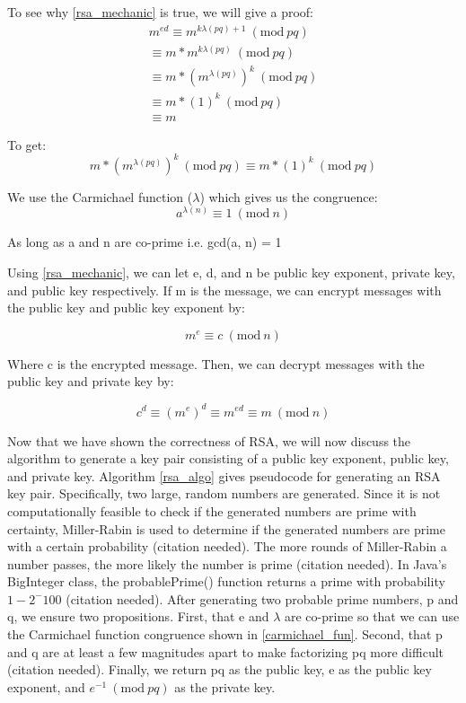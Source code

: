 \documentclass[acmlarge]{acmart}
\newcommand{\Mod}[1]{\ (\mathrm{mod}\ #1)}
\begin{document}
To see why \ref{rsa_mechanic} is true, we will give a proof:
\begin{equation}
\begin{split}
	m^{ed} 
	\equiv m^{k\lambda(pq) + 1} \Mod{pq} \\
	\equiv m * m^{k\lambda(pq)} \Mod{pq} \\
	\equiv m * (m^{\lambda(pq)})^{k} \Mod{pq} \\
	\equiv m * (1)^{k} \Mod{pq} \\
	\equiv m
\end{split}
\end{equation}

To get:
\begin{equation}
	m * (m^{\lambda(pq)})^{k} \Mod{pq} \equiv m * (1)^{k} \Mod{pq}
\end{equation}

We use the Carmichael function ($\lambda$) which gives us the congruence:
\begin{equation}
\label{carmichael_fun}
	a^{\lambda(n)} \equiv 1 \Mod{n}
\end{equation}

As long as a and n are co-prime i.e. gcd(a, n) = 1

Using \ref{rsa_mechanic}, we can let e, d, and n be public key exponent, private key, and public key respectively. If m is the message, we can encrypt messages with the public key and public key exponent by:

\begin{equation}
	m^{e} \equiv c \Mod{n}
\end{equation}

Where c is the encrypted message. Then, we can decrypt messages with the public key and private key by:

\begin{equation}
	c^{d} \equiv (m^{e})^{d} \equiv m^{ed} \equiv m \Mod{n}
\end{equation}

Now that we have shown the correctness of RSA, we will now discuss the algorithm to generate a key pair consisting of a public key exponent, public key, and private key. Algorithm \ref{rsa_algo} gives pseudocode for generating an RSA key pair. Specifically, two large, random numbers are generated. Since it is not computationally feasible to check if the generated numbers are prime with certainty, Miller-Rabin is used to determine if the generated numbers are prime with a certain probability (citation needed). The more rounds of Miller-Rabin a number passes, the more likely the number is prime (citation needed). In Java's BigInteger class, the probablePrime() function returns a prime with probability $1 - 2^-100$ (citation needed). After generating two probable prime numbers, p and q, we ensure two propositions. First, that e and $\lambda$ are co-prime so that we can use the Carmichael function congruence shown in \ref{carmichael_fun}. Second, that p and q are at least a few magnitudes apart to make factorizing pq more difficult (citation needed). Finally, we return pq as the public key, e as the public key exponent, and $e^{-1} \Mod{pq}$ as the private key.
\end{document}
